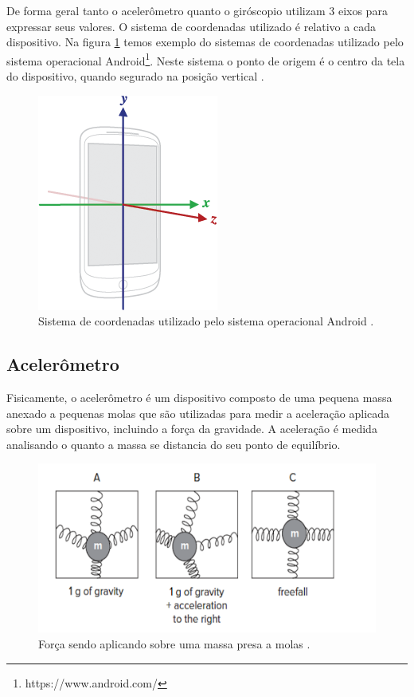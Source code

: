 De forma geral tanto o acelerômetro quanto o giróscopio utilizam 3 eixos para expressar seus valores. O sistema de coordenadas utilizado é relativo a cada dispositivo. Na figura \ref{fig:axis_device} temos  exemplo do sistemas de coordenadas utilizado pelo sistema operacional Android\footnote{https://www.android.com/}. Neste sistema o ponto de origem é o centro da tela do dispositivo, quando segurado na posição vertical \citep{sensorAndroidDocs}. 

\begin{figure}[ht]
	\centering
	\includegraphics[scale=0.6]{imagens/axis_device.png}
	\caption{Sistema de coordenadas utilizado pelo sistema operacional Android \citep{sensorAndroidDocs}.}
	\label{fig:axis_device}
\end{figure} 

\subsection{Acelerômetro}
\label{subsec:accelerometer}
Fisicamente, o acelerômetro é um dispositivo composto de uma pequena massa  anexado a pequenas molas que são utilizadas para medir a aceleração aplicada sobre um dispositivo, incluindo a força da gravidade. A aceleração é medida analisando o quanto a massa se distancia do seu ponto de equilíbrio. 

\begin{figure}[ht]
	\centering
	\includegraphics[scale=0.6]{imagens/MEMS_device.jpg}
	\caption{Força sendo aplicando sobre uma massa presa a molas \citep{milette2012professional}.}
	\label{fig:acelerometro}
\end{figure} 

